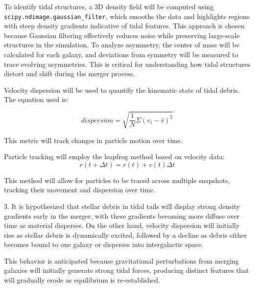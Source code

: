 \documentclass[fleqn,usenatbib]{mnras}
\begin{document}
To identify tidal structures, a 3D density field will be computed using \verb|scipy.ndimage.gaussian_filter|, which smooths the data and highlights regions with steep density gradients indicative of tidal features. This approach is chosen because Gaussian filtering effectively reduces noise while preserving large-scale structures in the simulation.
To analyze asymmetry, the center of mass will be calculated for each galaxy, and deviations from symmetry will be measured to trace evolving asymmetries. This is critical for understanding how tidal structures distort and shift during the merger process.

Velocity dispersion will be used to quantify the kinematic state of tidal debris. The equation used is:

\begin{equation}
    dispersion = \sqrt{\frac{1}{N}\Sigma (v_i-\bar{v})^2}
\end{equation}

This metric will track changes in particle motion over time.

Particle tracking will employ the leapfrog method based on velocity data:
\begin{equation}
    r(t+\Delta t)=r(t)+v(t) \Delta t
\end{equation}

This method will allow for particles to be traced across multiple snapshots, tracking their movement and dispersion over time.

3. It is hypothesized that stellar debris in tidal tails will display strong density gradients early in the merger, with these gradients becoming more diffuse over time as material disperses. On the other hand, velocity dispersion will initially rise as stellar debris is dynamically excited, followed by a decline as debris either becomes bound to one galaxy or disperses into intergalactic space.

This behavior is anticipated because gravitational perturbations from merging galaxies will initially generate strong tidal forces, producing distinct features that will gradually erode as equilibrium is re-established.




\bsp	%
\label{lastpage}
\end{document}
